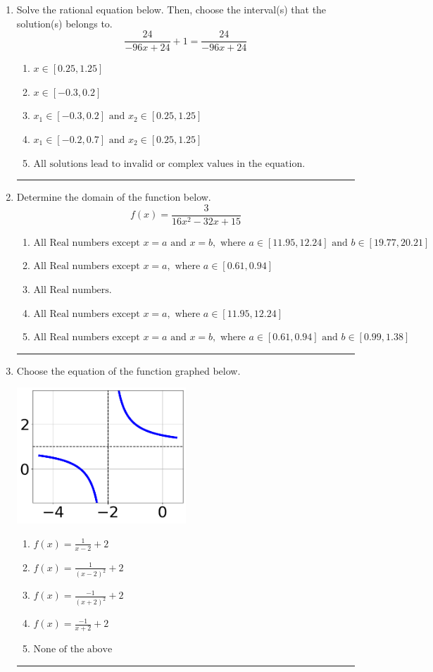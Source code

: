 \documentclass[14pt]{extbook}
\newcommand{\litem}[1]{\item#1\hspace*{-1cm}\rule{\textwidth}{0.4pt}}
\begin{document}
\begin{enumerate}
{\begin{enumerate}[label=\Alph*.]
\end{enumerate} }
\litem{
Solve the rational equation below. Then, choose the interval(s) that the solution(s) belongs to.\[ \frac{24}{-96x + 24} + 1 = \frac{24}{-96x + 24} \]\begin{enumerate}[label=\Alph*.]
\item \( x \in [0.25,1.25] \)
\item \( x \in [-0.3,0.2] \)
\item \( x_1 \in [-0.3, 0.2] \text{ and } x_2 \in [0.25,1.25] \)
\item \( x_1 \in [-0.2, 0.7] \text{ and } x_2 \in [0.25,1.25] \)
\item \( \text{All solutions lead to invalid or complex values in the equation.} \)

\end{enumerate} }
\litem{
Determine the domain of the function below.\[ f(x) = \frac{3}{16x^{2} -32 x + 15} \]\begin{enumerate}[label=\Alph*.]
\item \( \text{All Real numbers except } x = a \text{ and } x = b, \text{ where } a \in [11.95, 12.24] \text{ and } b \in [19.77, 20.21] \)
\item \( \text{All Real numbers except } x = a, \text{ where } a \in [0.61, 0.94] \)
\item \( \text{All Real numbers.} \)
\item \( \text{All Real numbers except } x = a, \text{ where } a \in [11.95, 12.24] \)
\item \( \text{All Real numbers except } x = a \text{ and } x = b, \text{ where } a \in [0.61, 0.94] \text{ and } b \in [0.99, 1.38] \)

\end{enumerate} }
\litem{
Choose the equation of the function graphed below.
\begin{center}
    \includegraphics[width=0.5\textwidth]{../Figures/rationalGraphToEquationCopyB.png}
\end{center}
\begin{enumerate}[label=\Alph*.]
\item \( f(x) = \frac{1}{x - 2} + 2 \)
\item \( f(x) = \frac{1}{(x - 2)^2} + 2 \)
\item \( f(x) = \frac{-1}{(x + 2)^2} + 2 \)
\item \( f(x) = \frac{-1}{x + 2} + 2 \)
\item \( \text{None of the above} \)


\end{enumerate}}
\end{enumerate}
\end{document}

